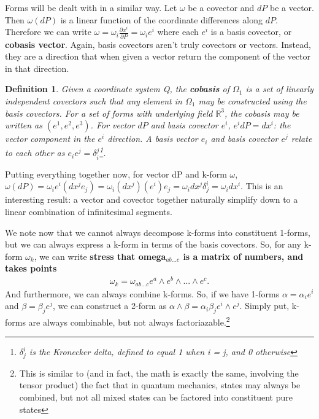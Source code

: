 \documentclass{book}
\newtheorem{defn}[equation]{Definition}
\begin{document}
Forms will be dealt with in a similar way. Let $\omega$ be a covector and $dP$ be a vector. Then $\omega(dP)$ is a linear function of the coordinate differences along $dP$. Therefore we can write $\omega = \omega_i \frac{\partial x^i}{\partial P} = \omega_i e^i$ where each $e^i$ is a basis covector, or \textbf{cobasis vector}. Again, basis covectors aren't truly covectors or vectors. Instead, they are a direction that when given a vector return the component of the vector in that direction. 

\begin{defn}
	Given a coordinate system Q, the \textbf{cobasis} of $\Omega_1$ is a set of linearly independent covectors such that any element in $\Omega_1$ may be constructed using the basis covectors. For a set of forms with underlying field $\mathbb{R}^3$, the cobasis may be written as $(e^1, e^2, e^3)$. For vector $dP$ and basis covector $e^i$, $e^i dP = dx^i$: the vector component in the $e^i$ direction. A basis vector $e_i$ and basis covector $e^j$ relate to each other as $e_ie^j = \delta^j_i$\footnote{$\delta^i_j$ is the Kronecker delta, defined to equal 1 when i = j, and 0 otherwise}. 
\end{defn}
 

Putting everything together now, for vector dP and k-form $\omega$, $\omega(dP) = \omega_ie^i(dx^je_j) = \omega_i(dx^j)(e^i)e_j = \omega_idx^j\delta^i_j = \omega_i dx^i$. This is an interesting result: a vector and covector together naturally simplify down to a linear combination of infinitesimal segments. 

We note now that we cannot always decompose k-forms into constituent 1-forms, but we can always express a k-form in terms of the basis covectors. So, for any k-form $\omega_k$, we can write \textbf{stress that omega$_{ab...c}$ is a matrix of numbers, and takes points} \begin{gather} \omega_k = \omega_{ab...c}e^a\wedge e^b \wedge ... \wedge e^c. \end{gather} And furthermore, we can always combine k-forms. So, if we have 1-forms $\alpha = \alpha_i e^i$ and $\beta = \beta_j e^j$, we can construct a 2-form as $\alpha\wedge\beta = \alpha_i\beta_j e^i\wedge e^j$. Simply put, k-forms are always combinable, but not always factoriazable.\footnote{This is similar to (and in fact, the math is exactly the same, involving the tensor product) the fact that in quantum mechanics, states may always be combined, but not all mixed states can be factored into constituent pure states}
\end{document}
